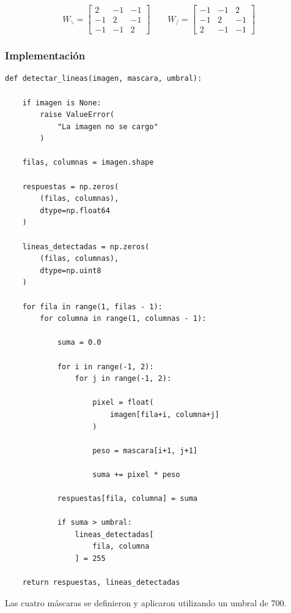 \documentclass[11pt,letterpaper]{article}
\begin{document}
\[
W_{\backslash}=
\begin{bmatrix}
2&-1&-1\\
-1&2&-1\\
-1&-1&2
\end{bmatrix}
\qquad
W_{/}=
\begin{bmatrix}
-1&-1&2\\
-1&2&-1\\
2&-1&-1
\end{bmatrix}
\]

\subsubsection*{Implementación}

\begin{lstlisting}
def detectar_lineas(imagen, mascara, umbral):

    if imagen is None:
        raise ValueError(
            "La imagen no se cargo"
        )

    filas, columnas = imagen.shape

    respuestas = np.zeros(
        (filas, columnas),
        dtype=np.float64
    )

    lineas_detectadas = np.zeros(
        (filas, columnas),
        dtype=np.uint8
    )

    for fila in range(1, filas - 1):
        for columna in range(1, columnas - 1):

            suma = 0.0

            for i in range(-1, 2):
                for j in range(-1, 2):

                    pixel = float(
                        imagen[fila+i, columna+j]
                    )

                    peso = mascara[i+1, j+1]

                    suma += pixel * peso

            respuestas[fila, columna] = suma

            if suma > umbral:
                lineas_detectadas[
                    fila, columna
                ] = 255

    return respuestas, lineas_detectadas
\end{lstlisting}

Las cuatro máscaras se definieron y
aplicaron utilizando un umbral de 700.
\end{document}
